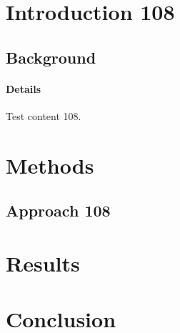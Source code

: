 \documentclass{article}
\begin{document}
\section{Introduction 108}
\subsection{Background}
\paragraph{Details} Test content 108.
\section{Methods}
\subsection{Approach 108}
\section{Results}
\section{Conclusion}
\end{document}
